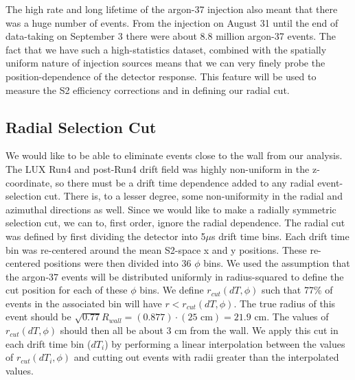 The high rate and long lifetime of the argon-37 injection also meant that there was a huge number of events. From the injection on August 31 until the end of data-taking on September 3 there were about 8.8 million argon-37 events. The fact that we have such a high-statistics dataset, combined with the spatially uniform nature of injection sources means that we can very finely probe the position-dependence of the detector response. This feature will be used to measure the S2 efficiency corrections and in defining our radial cut.

\subsection{Radial Selection Cut}
We would like to be able to eliminate events close to the wall from our analysis. The LUX Run4 and post-Run4 drift field was highly non-uniform in the z-coordinate, so there must be a drift time dependence added to any radial event-selection cut. There is, to a lesser degree, some non-uniformity in the radial and azimuthal directions as well. Since we would like to make a radially symmetric selection cut, we can to, first order, ignore the radial dependence. The radial cut was defined by first dividing the detector into 5$\mu$s drift time bins. Each drift time bin was re-centered around the mean S2-space x and y positions. These re-centered positions were then divided into 36 $\phi$ bins. We used the assumption that the argon-37 events will be distributed uniformly in radius-squared to define the cut position for each of these $\phi$ bins. We define $r_{cut}(dT,\phi)$ such that 77\% of events in the associated bin will have $r<r_{cut}(dT,\phi)$. The true radius of this event should be $\sqrt{0.77}R_{wall}=(0.877)\cdot (25 \text{\ cm})=21.9 \text{\ cm}$. The values of $r_{cut}(dT,\phi)$ should then all be about 3 cm from the wall. We apply this cut in each drift time bin ($dT_i$) by performing a linear interpolation between the values of $r_{cut}(dT_i,\phi)$ and cutting out events with radii greater than the interpolated values.
